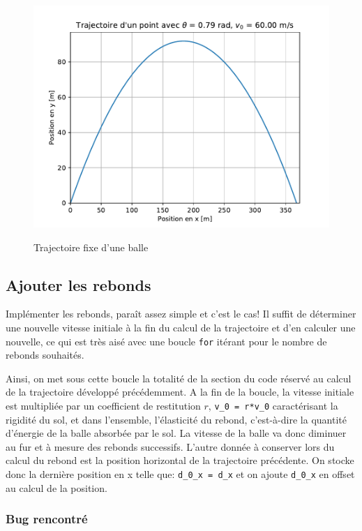 \documentclass[a4paper,11pt]{article}
\begin{document}
\begin{figure}[H]
	\centering
	\includegraphics[scale=0.5]{imgtraject_fixe.pdf}
	\label{fig:traject} \caption{Trajectoire fixe d'une balle}
\end{figure}

\subsection{Ajouter les rebonds}

Implémenter les rebonds, paraît assez simple et c'est le cas! Il suffit de déterminer une nouvelle vitesse initiale à la fin du calcul de la trajectoire et d'en calculer une nouvelle, ce qui est très aisé avec une boucle \verb|for| itérant pour le nombre de rebonds souhaités.

Ainsi, on met sous cette boucle la totalité de la section du code réservé au calcul de la trajectoire développé précédemment. A la fin de la boucle, la vitesse initiale est multipliée par un coefficient de restitution $r$, \verb|v_0 = r*v_0| caractérisant la rigidité du sol, et dans l'ensemble, l'élasticité du rebond, c'est-à-dire la quantité d'énergie de la balle absorbée par le sol. La vitesse de la balle va donc diminuer au fur et à mesure des rebonds successifs. L'autre donnée à conserver lors du calcul du rebond est la position horizontal de la trajectoire précédente. On stocke donc la dernière position en x telle que: \verb|d_0_x = d_x| et on ajoute \verb|d_0_x| en offset au calcul de la position. 


\subsubsection*{Bug rencontré}
\end{document}
